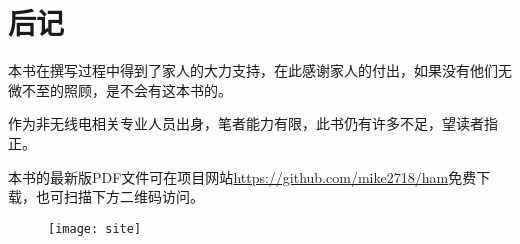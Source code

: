 \chapter*{后记}

本书在撰写过程中得到了家人的大力支持，在此感谢家人的付出，如果没有他们无微不至的照顾，是不会有这本书的。

作为非无线电相关专业人员出身，笔者能力有限，此书仍有许多不足，望读者指正。

本书的最新版PDF文件可在项目网站\url{https://github.com/mike2718/ham}免费下载，也可扫描下方二维码访问。

\begin{figure}[h]
  \texttt{[image: site]}
  \centering
\end{figure}

\newpage
